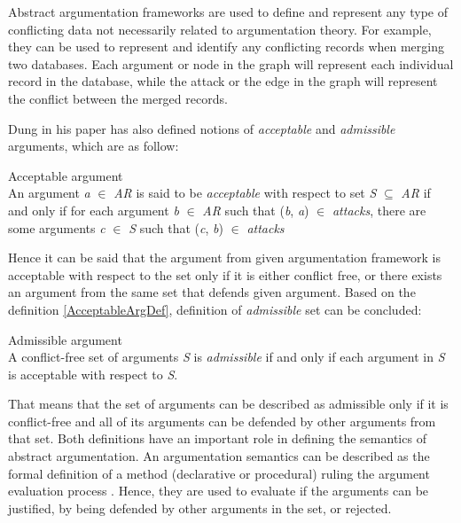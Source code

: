 Abstract argumentation frameworks are used to define and represent any type of conflicting data not necessarily related to argumentation theory. For example, they can be used to represent and identify any conflicting records when merging two databases. Each argument or node in the graph will represent each individual record in the database, while the attack or the edge in the graph will represent the conflict between the merged records. 

Dung in his paper \citep{dung1995} has also defined notions of \textit{acceptable} and \textit{admissible} arguments, which are as follow:

\begin{definition}{Acceptable argument}
\label{AcceptableArgDef}\\
An argument \textit{a} $\in$ \textit{AR} is said to be \textit{acceptable} with respect to set \textit{S} $\subseteq$ \textit{AR} if and only if for each argument \textit{b} $\in$ \textit{AR} such that (\textit{b}, \textit{a}) $\in$ \textit{attacks}, there are some arguments \textit{c} $\in$ \textit{S} such that (\textit{c}, \textit{b}) $\in$ \textit{attacks}
\end{definition}

Hence it can be said that the argument from given argumentation framework is acceptable with respect to the set only if it is either conflict free, or there exists an argument from the same set that defends given argument. Based on the definition \ref{AcceptableArgDef}, definition of \textit{admissible} set can be concluded:

\begin{definition}{Admissible argument} \label{admissibleArgument}
\label{AdmissibleArgDef}\\
A conflict-free set of arguments \textit{S} is \textit{admissible} if and only if each argument in \textit{S} is acceptable with respect to \textit{S}.
\end{definition}

That means that the set of arguments can be described as admissible only if it is conflict-free and all of its arguments can be defended by other arguments from that set. Both definitions have an important role in defining the semantics of abstract argumentation. An argumentation semantics can be described as the formal definition of a method (declarative or procedural) ruling the argument evaluation process \citep{baroni2009semantics}. Hence, they are used to evaluate if the arguments can be justified, by being defended by other arguments in the set, or rejected. 

